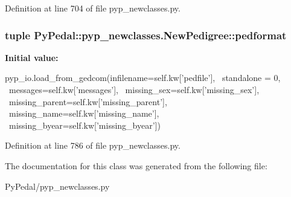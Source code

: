 Definition at line 704 of file pyp\_\-newclasses.py.

\hypertarget{classPyPedal_1_1pyp__newclasses_1_1NewPedigree_aa99c9e5a37e21d8ff3c0f71877aac615}{
\subsubsection[{pedformat}]{\setlength{\rightskip}{0pt plus 5cm}tuple PyPedal::pyp\_\-newclasses.NewPedigree::pedformat}}
\label{classPyPedal_1_1pyp__newclasses_1_1NewPedigree_aa99c9e5a37e21d8ff3c0f71877aac615}
{\bfseries Initial value:}
\begin{DoxyCode}
pyp_io.load_from_gedcom(infilename=self.kw['pedfile'], \
                    standalone = 0, \
                    messages=self.kw['messages'], \
                    missing_sex=self.kw['missing_sex'], \
                    missing_parent=self.kw['missing_parent'], \
                    missing_name=self.kw['missing_name'], \
                    missing_byear=self.kw['missing_byear'])
\end{DoxyCode}


Definition at line 786 of file pyp\_\-newclasses.py.



The documentation for this class was generated from the following file:\begin{DoxyCompactItemize}
\item 
PyPedal/pyp\_\-newclasses.py\end{DoxyCompactItemize}

